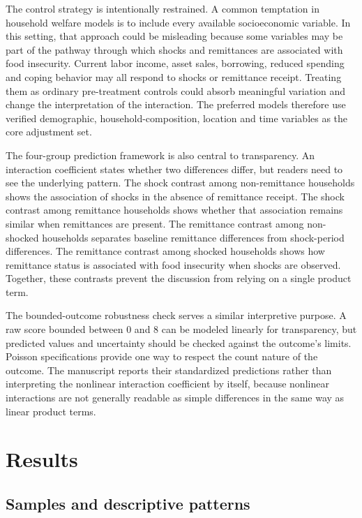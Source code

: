 \documentclass[11pt]{article}
\begin{document}
The control strategy is intentionally restrained. A common temptation in household welfare models is to include every available socioeconomic variable. In this setting, that approach could be misleading because some variables may be part of the pathway through which shocks and remittances are associated with food insecurity. Current labor income, asset sales, borrowing, reduced spending and coping behavior may all respond to shocks or remittance receipt. Treating them as ordinary pre-treatment controls could absorb meaningful variation and change the interpretation of the interaction. The preferred models therefore use verified demographic, household-composition, location and time variables as the core adjustment set.

The four-group prediction framework is also central to transparency. An interaction coefficient states whether two differences differ, but readers need to see the underlying pattern. The shock contrast among non-remittance households shows the association of shocks in the absence of remittance receipt. The shock contrast among remittance households shows whether that association remains similar when remittances are present. The remittance contrast among non-shocked households separates baseline remittance differences from shock-period differences. The remittance contrast among shocked households shows how remittance status is associated with food insecurity when shocks are observed. Together, these contrasts prevent the discussion from relying on a single product term.

The bounded-outcome robustness check serves a similar interpretive purpose. A raw score bounded between 0 and 8 can be modeled linearly for transparency, but predicted values and uncertainty should be checked against the outcome's limits. Poisson specifications provide one way to respect the count nature of the outcome. The manuscript reports their standardized predictions rather than interpreting the nonlinear interaction coefficient by itself, because nonlinear interactions are not generally readable as simple differences in the same way as linear product terms.

\section{Results}

\subsection{Samples and descriptive patterns}
\end{document}
